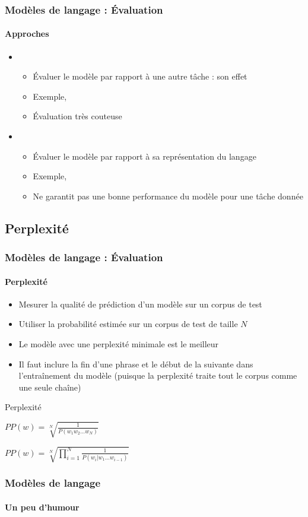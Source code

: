 \documentclass[xcolor=table]{beamer}
\begin{document}
\begin{frame}
\frametitle{Modèles de langage : Évaluation}
\framesubtitle{Approches}

\begin{itemize}
	\item {}
	\begin{itemize}
		\item Évaluer le modèle par rapport à une autre tâche : son effet
		\item Exemple,  
		\item Évaluation très couteuse
	\end{itemize}
	\item {}
	\begin{itemize}
		\item Évaluer le modèle par rapport à sa représentation du langage
		\item Exemple,  
		\item Ne garantit pas une bonne performance du modèle pour une tâche donnée
	\end{itemize}
\end{itemize}

\end{frame}

\subsection{Perplexité}

\begin{frame}
\frametitle{Modèles de langage : Évaluation}
\framesubtitle{Perplexité}

\begin{itemize}
	\item Mesurer la qualité de prédiction d'un modèle sur un corpus de test
	\item Utiliser la probabilité estimée sur un corpus de test de taille $N$
	\item Le modèle avec une perplexité minimale est le meilleur
	\item Il faut inclure la fin d'une phrase et le début de la suivante dans l'entraînement du modèle (puisque la perplexité traite tout le corpus comme une seule chaîne)
\end{itemize}

\begin{block}{Perplexité}
	\begin{center}
		$PP(w) = \sqrt[N]{\frac{1}{P(w_1 w_2 \ldots w_N)}}$
		
		$PP(w) = \sqrt[N]{\prod\limits_{i=1}^{N}\frac{1}{P(w_i | w_1 \ldots w_{i-1})}}$
	\end{center}
\end{block}

\end{frame}


\begin{frame}
\frametitle{Modèles de langage}
\framesubtitle{Un peu d'humour}

\begin{center}
\end{center}

\end{frame}

\end{document}

